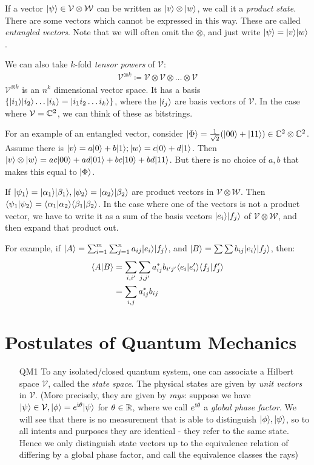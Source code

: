 \documentclass[10pt,a4paper]{article}
\begin{document}
If a vector $|\psi\rangle \in \mathcal{V}\otimes\mathcal{W}$ can be written as $|v\rangle\otimes |w\rangle$, we call it a \emph{product state}. There are some vectors which cannot be expressed in this way. These are called \emph{entangled vectors}. Note that we will often omit the $\otimes$, and just write $|\psi\rangle = |v\rangle|w\rangle$.

We can also take $k$-fold \emph{tensor powers} of $\mathcal{V}$:
\begin{align*}
\mathcal{V}^{\otimes k} \coloneq \mathcal{V}\otimes \mathcal{V}\otimes\ldots \otimes \mathcal{V}
\end{align*}
$\mathcal{V}^{\otimes k}$ is an $n^k$ dimensional vector space. It has a basis $\{|i_1\rangle|i_2\rangle\ldots|i_k\rangle = |i_1i_2\ldots i_k\rangle\}$, where the $|i_j\rangle$ are basis vectors of $\mathcal{V}$. In the case where $\mathcal{V} = \mathbb{C}^2$, we can think of these as bitstrings.

For an example of an entangled vector, consider $|\Phi\rangle = \frac{1}{\sqrt{2}}(|00\rangle + |11\rangle) \in \mathbb{C}^2 \otimes \mathbb{C}^2$. Assume there is $|v\rangle = a|0\rangle + b|1\rangle; |w\rangle = c|0\rangle + d|1\rangle$. Then $|v\rangle\otimes|w\rangle = ac|00\rangle+ad|01\rangle+bc|10\rangle+bd|11\rangle$. But there is no choice of $a, b$ that makes this equal to $|\Phi\rangle$.

If $|\psi_1\rangle = |\alpha_1\rangle|\beta_1\rangle, |\psi_2\rangle = |\alpha_2\rangle|\beta_2\rangle$ are product vectors in $\mathcal{V}\otimes\mathcal{W}$. Then $\langle \psi_1 | \psi_2 \rangle = \langle \alpha_1 | \alpha_2 \rangle\langle \beta_1 | \beta_2 \rangle$. In the case where one of the vectors is not a product vector, we have to write it as a sum of the basis vectors $|e_i\rangle|f_j\rangle$ of $\mathcal{V}\otimes\mathcal{W}$, and then expand that product out.

For example, if $|A\rangle = \sum_{i=1}^m \sum_{j=1}^n a_{ij}|e_i\rangle|f_j\rangle$, and $|B\rangle = \sum\sum b_{ij} |e_i\rangle|f_j\rangle$, then:
\begin{align*}
\langle A | B \rangle &= \sum_{i,i'}\sum_{j,j'} a_{ij}^*b_{i'j'} \langle e_i | e_i' \rangle\langle f_j | f_j' \rangle\\
&= \sum_{i,j} a_{ij}^* b_{ij}
\end{align*} 

\section{Postulates of Quantum Mechanics}
\begin{enumerate}
\item[QM1] To any isolated/closed quantum system, one can associate a Hilbert space $\mathcal{V}$, called the \emph{state space}. The physical states are given by \emph{unit vectors} in $\mathcal{V}$. (More precisely, they are given by \emph{rays}: suppose we have $|\psi\rangle\in \mathcal{V}, |\phi\rangle = e^{\mathfrak{i}\theta}|\psi\rangle$ for $\theta \in \mathbb{R}$, where we call $e^{\mathfrak{i}\theta}$ a \emph{global phase factor}. We will see that there is no measurement that is able to distinguish $|\phi\rangle, |\psi\rangle$, so to all intents and purposes they are identical - they refer to the same state. Hence we only distinguish state vectors up to the equivalence relation of differing by a global phase factor, and call the equivalence classes the rays)
\end{enumerate}
\end{document}
